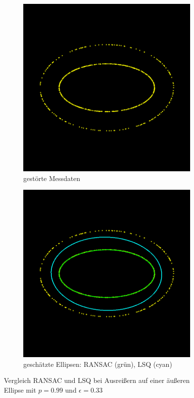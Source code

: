 {\begin{figure}[!htb]
	\begin{subfigure}{.5\textwidth}
		\centering
		\includegraphics[width=.9\textwidth]{images/ransacShadow33_0.png}
		\caption{gestörte Messdaten}
		\label{fig:nonmUniformRansa1}
	\end{subfigure}%
	\begin{subfigure}{.5\textwidth}
		\centering
		\includegraphics[width=.9\textwidth]{images/ransacShadow33_1.png}
		\caption{geschätzte Ellipsen: RANSAC (grün), LSQ (cyan)}
		\label{fig:nonmUniformRansac2}
	\end{subfigure}
	\caption{Vergleich RANSAC und LSQ bei Ausreißern auf einer äußeren Ellipse mit $p = 0.99$ und $\epsilon = 0.33$}
	\label{fig:nonmUniformRansac}
\end{figure}


}
